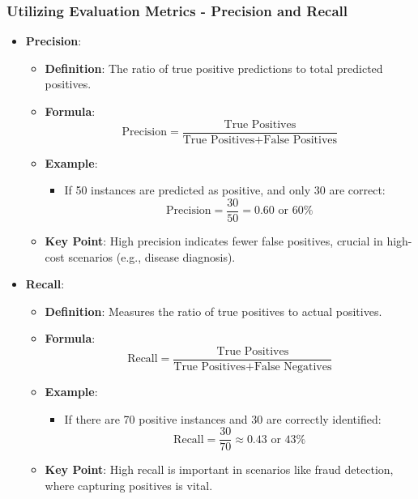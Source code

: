 \documentclass[aspectratio=169]{beamer}
\begin{document}
\begin{frame}[fragile]
  \frametitle{Utilizing Evaluation Metrics - Precision and Recall}
  \begin{itemize}
    \item \textbf{Precision}:
      \begin{itemize}
        \item \textbf{Definition}: The ratio of true positive predictions to total predicted positives.
        \item \textbf{Formula}:
        \begin{equation} 
          \text{Precision} = \frac{\text{True Positives}}{\text{True Positives} + \text{False Positives}} 
        \end{equation}
        \item \textbf{Example}:
          \begin{itemize}
            \item If 50 instances are predicted as positive, and only 30 are correct: 
            \begin{equation} 
              \text{Precision} = \frac{30}{50} = 0.60 \text{ or } 60\%
            \end{equation}
          \end{itemize}
        \item \textbf{Key Point}: High precision indicates fewer false positives, crucial in high-cost scenarios (e.g., disease diagnosis).
      \end{itemize}
  \end{itemize}
  
  \begin{itemize}
    \item \textbf{Recall}:
      \begin{itemize}
        \item \textbf{Definition}: Measures the ratio of true positives to actual positives.
        \item \textbf{Formula}:
        \begin{equation} 
          \text{Recall} = \frac{\text{True Positives}}{\text{True Positives} + \text{False Negatives}} 
        \end{equation}
        \item \textbf{Example}:
          \begin{itemize}
            \item If there are 70 positive instances and 30 are correctly identified:
            \begin{equation} 
              \text{Recall} = \frac{30}{70} \approx 0.43 \text{ or } 43\%
            \end{equation}
          \end{itemize}
        \item \textbf{Key Point}: High recall is important in scenarios like fraud detection, where capturing positives is vital.
      \end{itemize}
  \end{itemize}
\end{frame}
\end{document}
